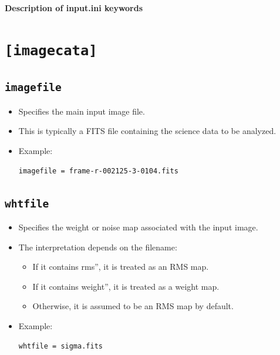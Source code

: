 \documentclass[11pt]{article}
\author{Vinu Vikraman}
\date{}
\begin{document}
\begin{center}
    {\huge \textbf{Description of input.ini keywords}}
\end{center}


\section{\texttt{[imagecata]}}
\subsection{\texttt{imagefile}}
\begin{itemize}
\item Specifies the main input image file.
\item This is typically a FITS file containing the science data to be analyzed.
\item Example:
\begin{verbatim}
imagefile = frame-r-002125-3-0104.fits
\end{verbatim}
\end{itemize}

\subsection{\texttt{whtfile}}
\begin{itemize}
\item Specifies the weight or noise map associated with the input image.
\item The interpretation depends on the filename:
\begin{itemize}
\item If it contains rms'', it is treated as an RMS map. \item If it contains weight'', it is treated as a weight map.
\item Otherwise, it is assumed to be an RMS map by default.
\end{itemize}
\item Example:
\begin{verbatim}
whtfile = sigma.fits
\end{verbatim}
\end{itemize}
\end{document}
